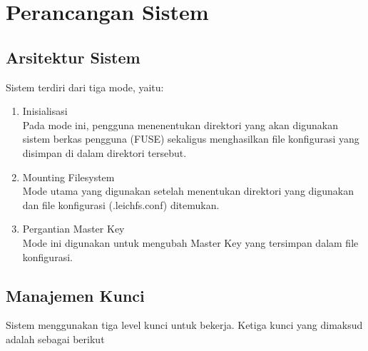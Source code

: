 \section{Perancangan Sistem}
\subsection{Arsitektur Sistem}

Sistem terdiri dari tiga mode, yaitu:

\begin{enumerate}
    \item Inisialisasi \\ Pada mode ini, pengguna menenentukan direktori yang akan digunakan sistem berkas pengguna (FUSE) sekaligus menghasilkan file konfigurasi yang disimpan di dalam direktori tersebut.
    \item Mounting Filesystem \\ Mode utama yang digunakan setelah menentukan direktori yang digunakan dan file konfigurasi (.leichfs.conf) ditemukan.
    \item Pergantian Master Key \\ Mode ini digunakan untuk mengubah Master Key yang tersimpan dalam file konfigurasi.
\end{enumerate}

\subsection{Manajemen Kunci}

Sistem menggunakan tiga level kunci untuk bekerja. Ketiga kunci yang dimaksud adalah sebagai berikut

